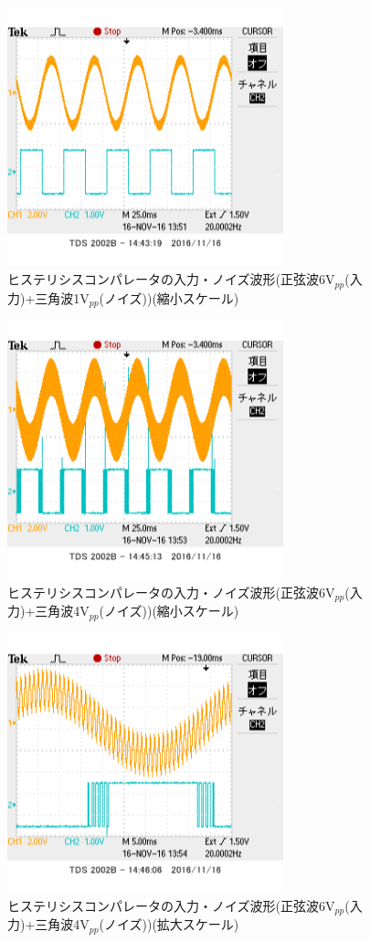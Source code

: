 \documentclass[11pt,a4j]{jsarticle}
\begin{document}
 \begin{figure}[htbp]
  \centering
  \includegraphics[width=8cm,clip]{1_2_noise_before_6-1_BigScale.png}
  \caption{ヒステリシスコンパレータの入力・ノイズ波形(正弦波6V$_{pp}$(入力)+三角波1V$_{pp}$(ノイズ))(縮小スケール)}
  \label{fig:noise_before_6-1_big}
 \end{figure}
 
 \begin{figure}[htbp]
  \centering
  \includegraphics[width=8cm,clip]{1_2_noise_before_6-4_BigScale}
  \caption{ヒステリシスコンパレータの入力・ノイズ波形(正弦波6V$_{pp}$(入力)+三角波4V$_{pp}$(ノイズ))(縮小スケール)}
  \label{fig:noise_before_6-4_big}
 \end{figure}
 
 \begin{figure}[htbp]
  \centering
  \includegraphics[width=8cm,clip]{1_2_noise_before_6-4_SmallScale.png}
  \caption{ヒステリシスコンパレータの入力・ノイズ波形(正弦波6V$_{pp}$(入力)+三角波4V$_{pp}$(ノイズ))(拡大スケール)}
  \label{fig:noise_before_6-4_small}
 \end{figure}
 
\end{document}
